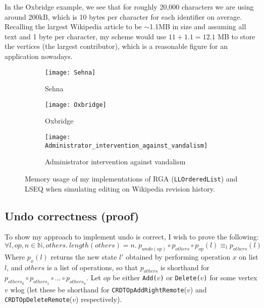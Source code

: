 \documentclass[diss.tex]{subfiles}
\begin{document}
In the Oxbridge example, we see that for roughly 20,000 characters we are using around 200kB, which is 10 bytes per character for each identifier on average. Recalling the largest Wikipedia article to be $\sim$1.1MB in size \cite{wikilongpages} and assuming all text and 1 byte per character, my scheme would use $11 + 1.1 = 12.1$ MB to store the vertices (the largest contributor), which is a reasonable figure for an application nowadays.
%
%
\begin{figure}[H]
\vspace{-3cm}

\begin{subfigure}{\linewidth}
\centering
\texttt{[image: Sehna]}
\caption{Sehna}
\label{fig:sehna}
\end{subfigure}

\begin{subfigure}{\linewidth}
\centering
\texttt{[image: Oxbridge]}
\caption{Oxbridge}
\label{fig:oxbridge}
\end{subfigure}

\begin{subfigure}{\linewidth}
\centering
\texttt{[image: Administrator\_intervention\_against\_vandalism]}
\caption{Administrator intervention against vandalism}
\label{fig:wiki_admin}
\end{subfigure}
\caption{Memory usage of my implementations of RGA (\texttt{LLOrderedList}) and LSEQ when simulating editing on Wikipedia revision history.} 
\label{fig:wiki_edits}
\end{figure}

\subsection{Undo correctness (proof)}
To show my approach to implement undo is correct, I wish to prove the following:
$$\forall l, op, n\in \mathbb{N}, others. ~length(others) = n.~ p_{undo(op)} \circ p_{others} \circ p_{op}(l)  \equiv_l p_{others}(l)$$
Where $p_x(l)$ returns the new state $l'$ obtained by performing operation $x$ on list $l$, and $others$ is a list of operations, so that $p_{others}$ is shorthand for $p_{others_0} \circ p_{others_1} \circ ... \circ p_{others_n}$. 
Let $op$ be either \texttt{Add{($v$)}} or \texttt{Delete{($v$)}} for some vertex $v$ wlog (let these be shorthand for \texttt{CRDTOpAddRightRemote}($v$) and \texttt{CRDTOpDeleteRemote}($v$) respectively).
\end{document}
